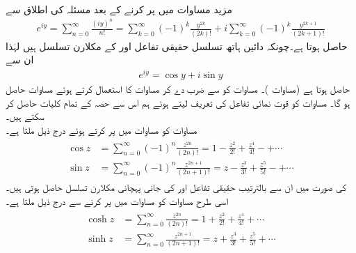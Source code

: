 مزید مساوات  میں  پر کرنے کے بعد مسئلہ  کی اطلاق سے
\begin{align*}
e^{iy}=\sum\limits_{n=0}^{\infty} \frac{(iy)^n}{n!}=\sum\limits_{k=0}^{\infty}(-1)^k\frac{y^{2k}}{(2k)!}+i\sum\limits_{k=0}^{\infty}(-1)^k\frac{y^{2k+1}}{(2k+1)!}
\end{align*}
حاصل ہوتا ہے۔چونکہ دائیں ہاتھ تسلسل  حقیقی تفاعل  اور  کے مکلارن تسلسل ہیں لہٰذا ان سے 
\begin{align}\label{مساوات_ٹیلر_یولر_کلیہ}
e^{iy}=\cos y+i\sin y
\end{align}
حاصل ہوتا ہے (مساوات )۔ مساوات  کو  سے ضرب دے کر مساوات  کا استعمال کرتے ہوئے مساوات  حاصل ہو گا۔ مساوات  کو قوت نمائی تفاعل کی تعریف  لیتے ہوئے ہم اس سے حصہ  کے تمام کلیات حاصل کر سکتے ہیں۔
\quad {}\\
مساوات  کو مساوات  میں پر کرتے ہوئے درج ذیل ملتا ہے۔
\begin{gather}
\begin{aligned}
\cos z&=\sum\limits_{n=0}^{\infty} (-1)^n\frac{z^{2n}}{(2n)!}=1-\frac{z^2}{2!}+\frac{z^4}{4!}-+\cdots\\
\sin z&=\sum\limits_{n=0}^{\infty} (-1)^n\frac{z^{2n+1}}{(2n+1)!}=z-\frac{z^3}{3!}+\frac{z^5}{5!}-+\cdots
\end{aligned}
\end{gather}
 کی صورت میں ان سے بالترتیب حقیقی تفاعل  اور  کی جانی پہچانی مکلارن تسلسل حاصل ہوتی ہیں۔اسی طرح مساوات  کو مساوات  میں پر کرنے سے درج ذیل ملتا ہے۔
\begin{gather}
\begin{aligned}
\cosh z&=\sum\limits_{n=0}^{\infty} \frac{z^{2n}}{(2n)!}=1+\frac{z^2}{2!}+\frac{z^4}{4!}+\cdots\\
\sinh z&=\sum\limits_{n=0}^{\infty} \frac{z^{2n+1}}{(2n+1)!}=z+\frac{z^3}{3!}+\frac{z^5}{5!}+\cdots
\end{aligned}
\end{gather}
